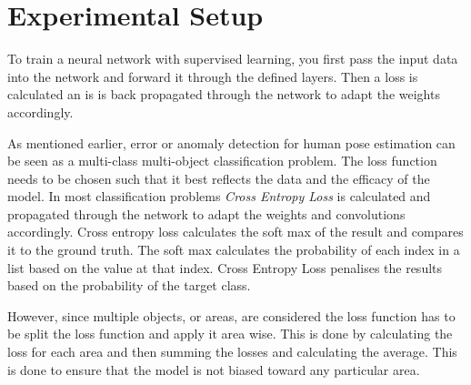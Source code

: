 \section{Experimental Setup}
\label{sec:model_training}



To train a neural network with supervised learning, you first pass the input data into the network and forward it through the defined layers. Then a loss is calculated an is is back propagated through the network to adapt the weights accordingly. 

As mentioned earlier, error or anomaly detection for human pose estimation can be seen as a multi-class multi-object classification problem. The loss function needs to be chosen such that it best reflects the data and the efficacy of the model. In most classification problems \textit{Cross Entropy Loss} is calculated and propagated through the network to adapt the weights and convolutions accordingly. Cross entropy loss calculates the soft max of the result and compares it to the ground truth. The soft max calculates the probability of each index in a list based on the value at that index. Cross Entropy Loss penalises the results based on the probability of the target class.

However, since multiple objects, or areas, are considered the loss function has to be split the loss function and apply it area wise. This is done by calculating the loss for each area and then summing the losses and calculating the average. This is done to ensure that the model is not biased toward any particular area. 
